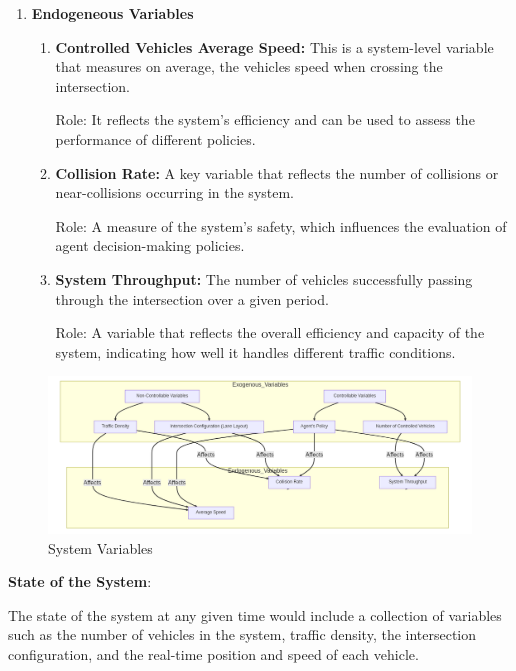 \begin{enumerate}
    \item \textbf{Endogeneous Variables}
    \begin{enumerate}
    \item \textbf{Controlled Vehicles Average Speed:}
          This is a system-level variable that measures on average, the vehicles speed when crossing the intersection.
          
          Role: It reflects the system's efficiency and can be used to assess the performance of different policies.

    \item \textbf{Collision Rate:}
          A key variable that reflects the number of collisions or near-collisions occurring in the system.
          
          Role: A measure of the system's safety, which influences the evaluation of agent decision-making policies.
          
    \item \textbf{System Throughput:}
          The number of vehicles successfully passing through the intersection over a given period.
          
          Role: A variable that reflects the overall efficiency and capacity of the system, indicating how well it handles different traffic conditions.
    \end{enumerate}
\end{enumerate}

\begin{figure}[H]
    \centering
    \includegraphics[height=0.25\textheight]{images/variables.png} 
    \caption{System Variables}
\end{figure}



\textbf{State of the System}:

The state of the system at any given time would include a collection of variables such as the number of vehicles in the system, traffic density, the intersection configuration, and the real-time position and speed of each vehicle. 

